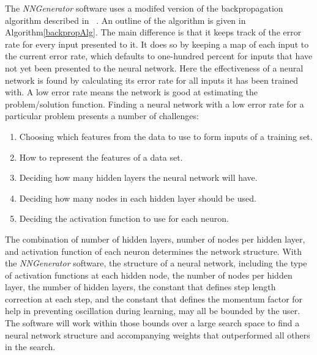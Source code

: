 The {\it NNGenerator} software uses a modifed version of the
backpropagation algorithm described in ~\cite[166-170]{rojas}.
An outline of the algorithm is given in Algorithm\ref{backpropAlg}.
The main difference is that it keeps track of the error rate for every
input presented to it.
It does so by keeping a map of each input to the current error rate,
which defaults to one-hundred percent for inputs that have not yet
been presented to the neural network.
Here the effectiveness of a neural network is found by calculating
its error rate for all inputs it has been trained with. 
A low error rate means the network is good at estimating the
problem/solution function. 
Finding a neural network with a low error rate for a particular
problem presents a number of challenges:
\begin{enumerate}

\item Choosing which features from the data to
use to form inputs of a training set.

\item How to represent the features of a data set.

\item Deciding how many hidden layers the neural network will have.

\item Deciding how many nodes in each hidden layer should be used.

\item Deciding the activation function to use for each neuron.

\end{enumerate}
The combination of number of hidden layers, number of nodes per hidden
layer, and activation function of each neuron determines the network structure. 
With the {\it NNGenerator} software, the structure of a neural
network, including the type of activation functions at each hidden
node, the number of nodes per hidden layer, the number of hidden
layers, the constant that defines step length correction at each step,
and the constant that defines the momentum factor for help in
preventing oscillation during learning, may all be bounded by the
user.
The software will work within those bounds over a large search space
to find a neural network structure and accompanying weights that
outperformed all others in the search.

